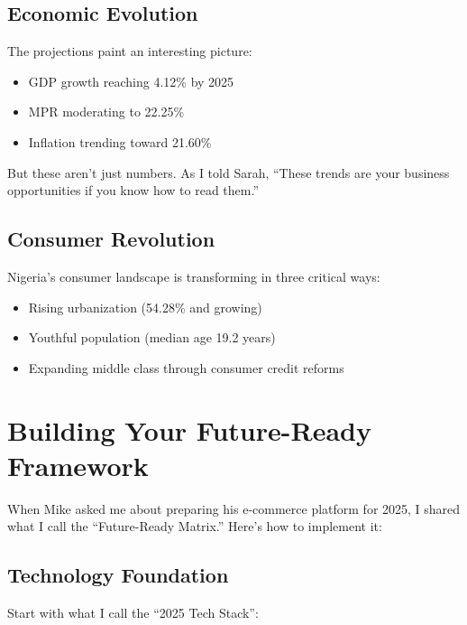 \subsection{Economic Evolution}\label{subsec:economic-evolution}

The projections paint an interesting picture:
\begin{itemize}
    \item GDP growth reaching 4.12\% by 2025
    \item MPR moderating to 22.25\%
    \item Inflation trending toward 21.60\%
\end{itemize}

But these aren't just numbers. As I told Sarah, ``These trends are your business opportunities if you know how to read them.''

\subsection{Consumer Revolution}\label{subsec:consumer-revolution}

Nigeria's consumer landscape is transforming in three critical ways:
\begin{itemize}
    \item Rising urbanization (54.28\% and growing)
    \item Youthful population (median age 19.2 years)
    \item Expanding middle class through consumer credit reforms
\end{itemize}

\section{Building Your Future-Ready Framework}\label{sec:future-ready-framework}

When Mike asked me about preparing his e-commerce platform for 2025, I shared what I call the ``Future-Ready Matrix.'' Here's how to implement it:

\subsection{Technology Foundation}\label{subsec:tech-foundation}

Start with what I call the ``2025 Tech Stack'':

